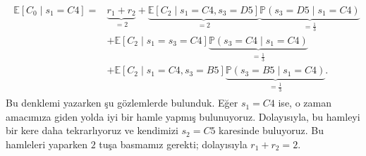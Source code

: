 \begin{align}
    \begin{split}
    \mathbb{E}\left[ C_0 \mid s_1 = C4 \right] = &\underbrace{r_1 + r_2}_{=2} 
    + \underbrace{\mathbb{E}[C_2 \mid s_1 = C4, s_3 = D5]}_{=2} \underbrace{\mathbb{P}(s_3 = D5 \mid s_1 = C4)}_{=\frac{1}{3}} \\
    &+ \mathbb{E}[C_2 \mid s_1 = s_3 = C4] \underbrace{\mathbb{P}(s_3 = C4 \mid s_1 = C4)}_{=\frac{1}{3}} \\
    &+ \mathbb{E}[C_2 \mid s_1 = C4, s_3 = B5] \underbrace{\mathbb{P}(s_3 = B5 \mid s_1 = C4)}_{=\frac{1}{3}}.
    \end{split}
    \label{eq:tower2}
\end{align}
%
Bu denklemi yazarken \c{s}u g\"{o}zlemlerde bulunduk. E\u{g}er $s_1 = C4$ ise, o
zaman amac{\i}m{\i}za giden yolda iyi bir hamle yapm{\i}\c{s} bulunuyoruz.
Dolay{\i}s{\i}yla, bu hamleyi bir kere daha tekrarl{\i}yoruz ve kendimizi $s_2 =
C5$ karesinde buluyoruz. Bu hamleleri yaparken $2$ tu\c{s}a basmam{\i}z gerekti;
dolay{\i}s{\i}yla $r_1 + r_2 = 2$.

